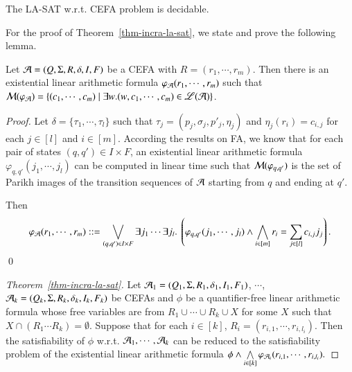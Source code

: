 \begin{example}
\end{example}

\begin{theorem}\label{thm-incra-la-sat}
	The LA-SAT w.r.t. CEFA problem is decidable.
\end{theorem}

For the proof of Theorem~\ref{thm-incra-la-sat}, we state and prove the following lemma. 

\begin{lemma}\label{lem-incra-la}
	Let $\mathcal{A}=(Q, \Sigma, R, \delta, I, F)$ be a CEFA with $R= (r_1, \cdots,  r_m)$. Then there is an existential linear arithmetic formula $\varphi_{\mathcal{A}}(r_1, \cdots, r_m)$ such that $\mathcal{M}(\varphi_{\mathcal{A}})= \{(c_1, \cdots, c_m) \mid \exists w.  (w, c_1, \cdots, c_m) \in \mathscr{L}(\mathcal{A})\}$.
\end{lemma}

\begin{proof}
	Let $\delta = \{\tau_1, \cdots, \tau_l\}$ such that $\tau_j = (p_j, \sigma_j, p'_j, \eta_j)$ and $\eta_j(r_i) =  c_{i,j}$ for each $j \in [l]$ and $i \in [m]$.
	According the results on FA, we know that for each pair of states $(q, q') \in I \times F$,  an existential linear arithmetic formula $\varphi_{q,q'}(j_1, \cdots, j_l)$ can be computed in linear time such that $\mathcal{M}(\varphi_{q,q'})$ is the set of Parikh images of the transition sequences of $\mathcal{A}$ starting from $q$ and ending at $q'$. 
	
	Then 
	\[\varphi_\NFA(r_1, \cdots, r_m) ::= \bigvee \limits_{(q,q') \in I \times F} \exists j_1 \cdots \exists j_l.\ \left(\varphi_{q,q'}(j_1, \cdots, j_l) \wedge \bigwedge \limits_{i \in [m]} r_i = \sum \limits_{j \in [l]} c_{i,j} j_j \right).\]
	\qed
\end{proof}

\begin{proof}[Theorem~\ref{thm-incra-la-sat}]
	Let $\mathcal{A}_1=(Q_1, \Sigma, R_1, \delta_1, I_1, F_1)$, $\cdots$, $\mathcal{A}_k=(Q_k, \Sigma, R_k, \delta_k, I_k, F_k)$ be CEFAs and $\phi$ be a quantifier-free linear arithmetic formula whose free variables are from  $R_1 \cup \cdots \cup R_k \cup X$ for some $X$ such that $X \cap (R_1 \cdots R_k) = \emptyset$.
	Suppose that for each $i \in [k]$, $R_i = (r_{i, 1}, \cdots, r_{i, l_i})$. Then the satisfiability of $\phi$ w.r.t. $\mathcal{A}_1,\cdots, \mathcal{A}_k$ can be reduced to the satisfiability problem of the  existential linear arithmetic formula
	$
	\phi \wedge \bigwedge \limits_{i \in [k]} \varphi_{\mathcal{A}_i}(r_{i,1}, \cdots, r_{i, l_i}).
	$
\end{proof}

